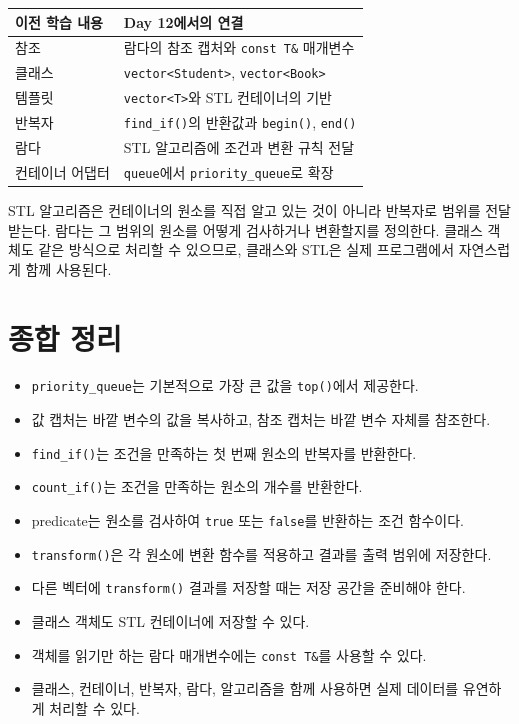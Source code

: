 \documentclass[11pt,a4paper]{article}
\begin{document}
\begin{center}
\begin{tabular}{ll}
\toprule
이전 학습 내용 & Day 12에서의 연결 \\
\midrule
참조 & 람다의 참조 캡처와 \texttt{const T\&} 매개변수 \\
클래스 & \texttt{vector<Student>}, \texttt{vector<Book>} \\
템플릿 & \texttt{vector<T>}와 STL 컨테이너의 기반 \\
반복자 & \texttt{find\_if()}의 반환값과 \texttt{begin()}, \texttt{end()} \\
람다 & STL 알고리즘에 조건과 변환 규칙 전달 \\
컨테이너 어댑터 & \texttt{queue}에서 \texttt{priority\_queue}로 확장 \\
\bottomrule
\end{tabular}
\end{center}

\begin{importantbox}
STL 알고리즘은 컨테이너의 원소를 직접 알고 있는 것이 아니라 반복자로 범위를 전달받는다.
람다는 그 범위의 원소를 어떻게 검사하거나 변환할지를 정의한다.
클래스 객체도 같은 방식으로 처리할 수 있으므로,
클래스와 STL은 실제 프로그램에서 자연스럽게 함께 사용된다.
\end{importantbox}

\section{종합 정리}
\begin{importantbox}
\begin{itemize}[leftmargin=1.5em]
    \item \texttt{priority\_queue}는 기본적으로 가장 큰 값을 \texttt{top()}에서 제공한다.
    \item 값 캡처는 바깥 변수의 값을 복사하고, 참조 캡처는 바깥 변수 자체를 참조한다.
    \item \texttt{find\_if()}는 조건을 만족하는 첫 번째 원소의 반복자를 반환한다.
    \item \texttt{count\_if()}는 조건을 만족하는 원소의 개수를 반환한다.
    \item predicate는 원소를 검사하여 \texttt{true} 또는 \texttt{false}를 반환하는 조건 함수이다.
    \item \texttt{transform()}은 각 원소에 변환 함수를 적용하고 결과를 출력 범위에 저장한다.
    \item 다른 벡터에 \texttt{transform()} 결과를 저장할 때는 저장 공간을 준비해야 한다.
    \item 클래스 객체도 STL 컨테이너에 저장할 수 있다.
    \item 객체를 읽기만 하는 람다 매개변수에는 \texttt{const T\&}를 사용할 수 있다.
    \item 클래스, 컨테이너, 반복자, 람다, 알고리즘을 함께 사용하면 실제 데이터를 유연하게 처리할 수 있다.
\end{itemize}
\end{importantbox}
\end{document}
